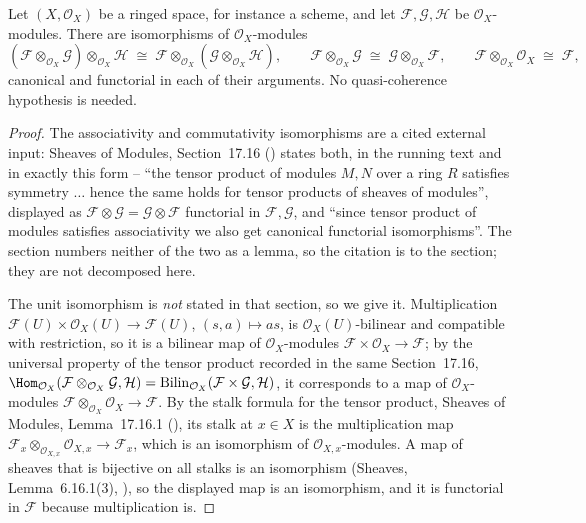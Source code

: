 \begin{lemma}
\label{lem:pcb-tensor-monoidal}
Let \((X,\mathcal O_X)\) be a ringed space, for instance a scheme, and
let \(\mathcal F,\mathcal G,\mathcal H\) be \(\mathcal O_X\)-modules.
There are isomorphisms of \(\mathcal O_X\)-modules
\[
 (\mathcal F\otimes_{\mathcal O_X}\mathcal G)\otimes_{\mathcal O_X}
 \mathcal H\;\cong\;\mathcal F\otimes_{\mathcal O_X}
 (\mathcal G\otimes_{\mathcal O_X}\mathcal H),
 \qquad
 \mathcal F\otimes_{\mathcal O_X}\mathcal G\;\cong\;
 \mathcal G\otimes_{\mathcal O_X}\mathcal F,
 \qquad
 \mathcal F\otimes_{\mathcal O_X}\mathcal O_X\;\cong\;\mathcal F,
\]
canonical and functorial in each of their arguments.  No
quasi-coherence hypothesis is needed.
\end{lemma}
\begin{proof}
The associativity and commutativity isomorphisms are a cited external
input: Sheaves of Modules, Section~17.16 () states
both, in the running text and in exactly this form -- ``the tensor
product of modules \(M,N\) over a ring \(R\) satisfies symmetry
\(\dots\) hence the same holds for tensor products of sheaves of
modules'', displayed as \(\mathcal F\otimes\mathcal G=\mathcal
G\otimes\mathcal F\) functorial in \(\mathcal F,\mathcal G\), and
``since tensor product of modules satisfies associativity we also get
canonical functorial isomorphisms''.  The section numbers neither of
the two as a lemma, so the citation is to the section; they are not
decomposed here.

The unit isomorphism is \emph{not} stated in that section, so we give
it.  Multiplication \(\mathcal F(U)\times\mathcal O_X(U)\to
\mathcal F(U)\), \((s,a)\mapsto as\), is \(\mathcal
O_X(U)\)-bilinear and compatible with restriction, so it is a bilinear
map of \(\mathcal O_X\)-modules \(\mathcal F\times\mathcal
O_X\to\mathcal F\); by the universal property of the tensor product
recorded in the same Section~17.16, \(\Hom_{\mathcal O_X}(\mathcal
F\otimes_{\mathcal O_X}\mathcal G,\mathcal H)=
\mathrm{Bilin}_{\mathcal O_X}(\mathcal F\times\mathcal G,\mathcal
H)\), it corresponds to a map of \(\mathcal O_X\)-modules
\(\mathcal F\otimes_{\mathcal O_X}\mathcal O_X\to\mathcal F\).
By the stalk
formula for the tensor product, Sheaves of Modules, Lemma~17.16.1
(), its stalk at \(x\in X\) is the multiplication
map \(\mathcal F_x\otimes_{\mathcal O_{X,x}}\mathcal O_{X,x}\to
\mathcal F_x\), which is an isomorphism of \(\mathcal O_{X,x}\)-modules.
A map of sheaves that is bijective on all stalks is an isomorphism
(Sheaves, Lemma~6.16.1(3), ), so the displayed map
is an isomorphism, and it is functorial in \(\mathcal F\) because
multiplication is.
\end{proof}

